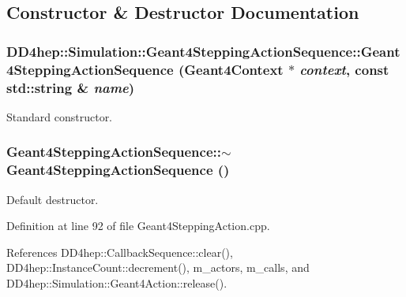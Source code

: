 \subsection{Constructor \& Destructor Documentation}
\hypertarget{class_d_d4hep_1_1_simulation_1_1_geant4_stepping_action_sequence_ad87447c0f76a0e4fb5f294c1c4117432}{
\subsubsection[{Geant4SteppingActionSequence}]{\setlength{\rightskip}{0pt plus 5cm}DD4hep::Simulation::Geant4SteppingActionSequence::Geant4SteppingActionSequence ({\bf Geant4Context} $\ast$ {\em context}, \/  const std::string \& {\em name})}}
\label{class_d_d4hep_1_1_simulation_1_1_geant4_stepping_action_sequence_ad87447c0f76a0e4fb5f294c1c4117432}


Standard constructor. \hypertarget{class_d_d4hep_1_1_simulation_1_1_geant4_stepping_action_sequence_a7b7b346f45f9194e6aec6eafdde18448}{
\subsubsection[{$\sim$Geant4SteppingActionSequence}]{\setlength{\rightskip}{0pt plus 5cm}Geant4SteppingActionSequence::$\sim$Geant4SteppingActionSequence ()}}
\label{class_d_d4hep_1_1_simulation_1_1_geant4_stepping_action_sequence_a7b7b346f45f9194e6aec6eafdde18448}


Default destructor. 

Definition at line 92 of file Geant4SteppingAction.cpp.

References DD4hep::CallbackSequence::clear(), DD4hep::InstanceCount::decrement(), m\_\-actors, m\_\-calls, and DD4hep::Simulation::Geant4Action::release().


